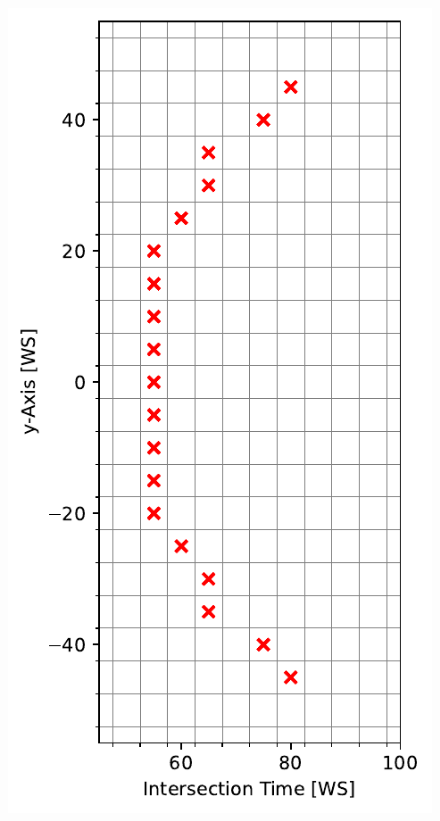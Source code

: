 \begin{figure}[h]
  \includegraphics[width=\linewidth]{res/intersection_time.pdf}
  \endminipage\hfill

\end{figure}
